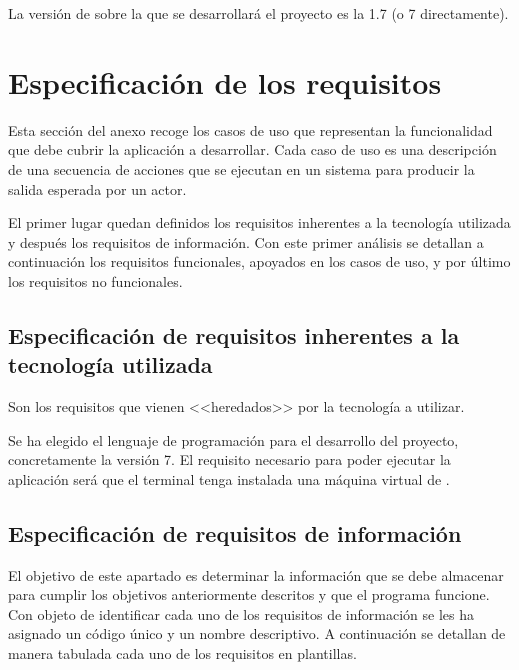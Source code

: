 La versión de \java{} sobre la que se desarrollará el proyecto es la 1.7 (o 7 directamente).
\newpage



\section{Especificación de los requisitos}
Esta sección del anexo recoge los casos de uso que representan la funcionalidad que debe cubrir la aplicación a desarrollar. Cada caso de uso es una descripción de una secuencia de acciones que se ejecutan en un sistema para producir la salida esperada por un actor.

El primer lugar quedan definidos los requisitos inherentes a la tecnología utilizada y después los requisitos de información. Con este primer análisis se detallan a continuación los requisitos funcionales, apoyados en los casos de uso, y por último los requisitos no funcionales.


\subsection{Especificación de requisitos inherentes a la tecnología utilizada}
Son los requisitos que vienen <<heredados>> por la tecnología a utilizar.

Se ha elegido el lenguaje de programación \java{} para el desarrollo del proyecto, concretamente la versión 7. El requisito necesario para poder ejecutar la aplicación será que el terminal tenga instalada una máquina virtual de \java{}.


\subsection{Especificación de requisitos de información}
El objetivo de este apartado es determinar la información que se debe almacenar para cumplir los objetivos anteriormente descritos y que el programa funcione.
Con objeto de identificar cada uno de los requisitos de información se les ha asignado un código único y un nombre descriptivo. A continuación  se detallan de manera tabulada cada uno de los requisitos en plantillas.

